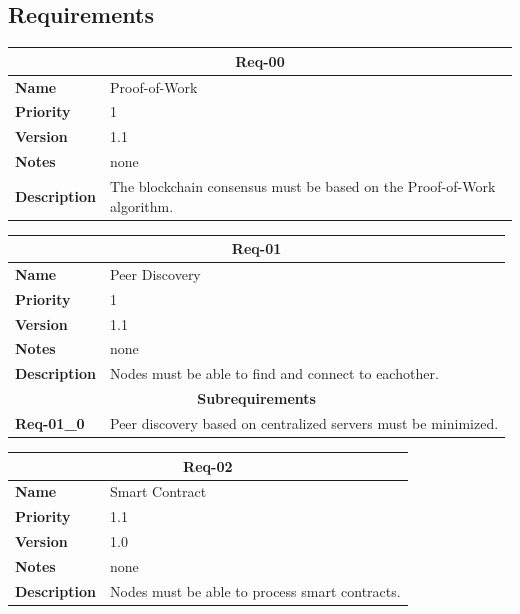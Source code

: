 \documentclass[../documentation.tex]{subfiles}
\begin{document}
\subsection{Requirements}

\bgroup{}
\def\arraystretch{1.25}
\begin{center}
    \begin{tabular}{ |l|p{9cm}| }
        \hline
        \multicolumn{2}{|c|}{\textbf{Req-00}} \\
        \hline
        \textbf{Name} & Proof-of-Work \\
        \hline
        \textbf{Priority} & 1 \\
        \hline
        \textbf{Version} & 1.1 \\
        \hline
        \textbf{Notes} & none \\
        \hline
        \textbf{Description} & The blockchain consensus must be based on the Proof-of-Work algorithm. \\
        \hline
    \end{tabular}
\end{center}
\egroup{}

\bgroup{}
\def\arraystretch{1.25}
\begin{center}
    \begin{tabular}{ |l|p{9cm}| }
        \hline
        \multicolumn{2}{|c|}{\textbf{Req-01}} \\
        \hline
        \textbf{Name} & Peer Discovery \\
        \hline
        \textbf{Priority} & 1 \\
        \hline
        \textbf{Version} & 1.1 \\
        \hline
        \textbf{Notes} & none \\
        \hline
        \textbf{Description} & Nodes must be able to find and connect to eachother. \\
        \hline
        \multicolumn{2}{|c|}{\textbf{Subrequirements}} \\
        \hline
        \textbf{Req-01\_0} & Peer discovery based on centralized servers must be minimized. \\
        \hline
    \end{tabular}
\end{center}
\egroup{}

\bgroup{}
\def\arraystretch{1.25}
\begin{center}
    \begin{tabular}{ |l|p{9cm}| }
        \hline
        \multicolumn{2}{|c|}{\textbf{Req-02}} \\
        \hline
        \textbf{Name} & Smart Contract \\
        \hline
        \textbf{Priority} & 1.1 \\
        \hline
        \textbf{Version} & 1.0 \\
        \hline
        \textbf{Notes} & none \\
        \hline
        \textbf{Description} & Nodes must be able to process smart contracts. \\
        \hline
    \end{tabular}
\end{center}
\egroup{}
\end{document}

